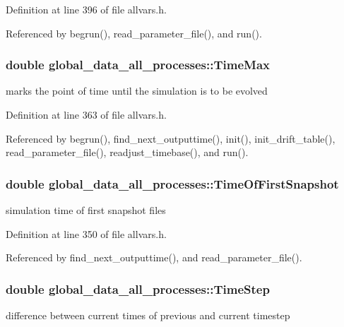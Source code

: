 Definition at line 396 of file allvars.h.



Referenced by begrun(), read\_\-parameter\_\-file(), and run().

\hypertarget{structglobal__data__all__processes_a3e22fbc2ce177c1e383e9acbbf44f8d5}{
\subsubsection[{TimeMax}]{\setlength{\rightskip}{0pt plus 5cm}double {\bf global\_\-data\_\-all\_\-processes::TimeMax}}}
\label{structglobal__data__all__processes_a3e22fbc2ce177c1e383e9acbbf44f8d5}
marks the point of time until the simulation is to be evolved 

Definition at line 363 of file allvars.h.



Referenced by begrun(), find\_\-next\_\-outputtime(), init(), init\_\-drift\_\-table(), read\_\-parameter\_\-file(), readjust\_\-timebase(), and run().

\hypertarget{structglobal__data__all__processes_a18e4063fbc1f92e8c59d6e59c7b20631}{
\subsubsection[{TimeOfFirstSnapshot}]{\setlength{\rightskip}{0pt plus 5cm}double {\bf global\_\-data\_\-all\_\-processes::TimeOfFirstSnapshot}}}
\label{structglobal__data__all__processes_a18e4063fbc1f92e8c59d6e59c7b20631}
simulation time of first snapshot files 

Definition at line 350 of file allvars.h.



Referenced by find\_\-next\_\-outputtime(), and read\_\-parameter\_\-file().

\hypertarget{structglobal__data__all__processes_a05a40a90ec77ac379054f82acbec87dc}{
\subsubsection[{TimeStep}]{\setlength{\rightskip}{0pt plus 5cm}double {\bf global\_\-data\_\-all\_\-processes::TimeStep}}}
\label{structglobal__data__all__processes_a05a40a90ec77ac379054f82acbec87dc}
difference between current times of previous and current timestep 


